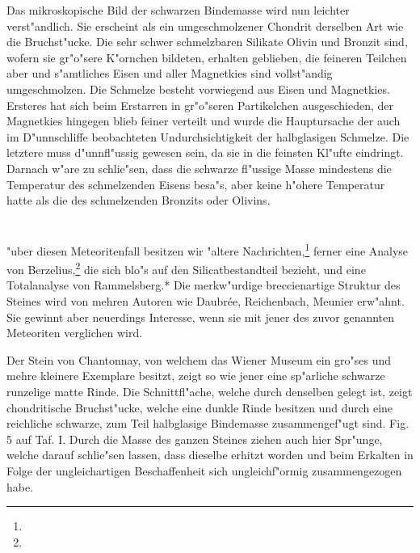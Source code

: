 \documentclass[a4paper, 11pt, oneside]{article}
\begin{document}
Das mikroskopische Bild der schwarzen Bindemasse wird nun leichter verst"andlich. Sie erscheint als ein umgeschmolzener Chondrit derselben Art wie die Bruchst"ucke. Die sehr schwer schmelzbaren Silikate Olivin und Bronzit sind, wofern sie gr"o"sere K"ornchen bildeten, erhalten geblieben, die feineren Teilchen aber und s"amtliches Eisen und aller Magnetkies sind vollst"andig umgeschmolzen. Die Schmelze besteht vorwiegend aus Eisen und Magnetkies. Ersteres hat sich beim Erstarren in gr"o"seren Partikelchen ausgeschieden, der Magnetkies hingegen blieb feiner verteilt und wurde die Hauptursache der auch im D"unnschliffe beobachteten Undurchsichtigkeit der halbglasigen Schmelze. Die letztere muss d"unnfl"ussig gewesen sein, da sie in die feinsten Kl"ufte eindringt. Darnach w"are zu schlie"sen, dass die schwarze fl"ussige Masse mindestens die Temperatur des schmelzenden Eisens besa"s, aber keine h"ohere Temperatur hatte als die des schmelzenden Bronzits oder Olivins.
\section{}
\paragraph{}
"uber diesen Meteoritenfall besitzen wir "altere Nachrichten,\footnote{} ferner eine Analyse von Berzelius,\footnote{} die sich blo"s auf den Silicatbestandteil bezieht, und eine Totalanalyse von Rammelsberg.* Die merkw"urdige breccienartige Struktur des Steines wird von mehren Autoren wie Daubrée, Reichenbach, Meunier erw"ahnt. Sie gewinnt aber neuerdings Interesse, wenn sie mit jener des zuvor genannten Meteoriten verglichen wird.

Der Stein von Chantonnay, von welchem das Wiener Museum ein gro"ses und mehre kleinere Exemplare besitzt, zeigt so wie jener eine sp"arliche schwarze runzelige matte Rinde. Die Schnittfl"ache, welche durch denselben gelegt ist, zeigt chondritische Bruchst"ucke, welche eine dunkle Rinde besitzen und durch eine reichliche schwarze, zum Teil halbglasige Bindemasse zusammengef"ugt sind. Fig. 5 auf Taf. I. Durch die Masse des ganzen Steines ziehen auch hier Spr"unge, welche darauf schlie"sen lassen, dass dieselbe erhitzt worden und beim Erkalten in Folge der ungleichartigen Beschaffenheit sich ungleichf"ormig zusammengezogen habe.
\end{document}
